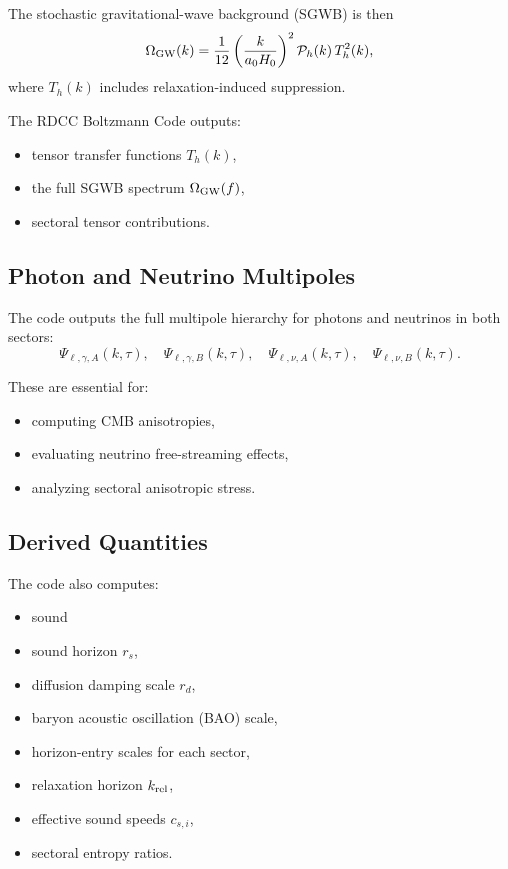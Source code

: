 \documentclass[11pt,a4paper]{article}
\begin{document}
The stochastic gravitational-wave background (SGWB) is then
\begin{equation}
\Omega_{\rm GW}(k) =
\frac{1}{12}\left(\frac{k}{a_0H_0}\right)^2
\mathcal{P}_h(k)\,T_h^2(k),
\end{equation}
where $T_h(k)$ includes relaxation-induced suppression.

The RDCC Boltzmann Code outputs:

\begin{itemize}
\item tensor transfer functions $T_h(k)$,
\item the full SGWB spectrum $\Omega_{\rm GW}(f)$,
\item sectoral tensor contributions.
\end{itemize}

\subsection{Photon and Neutrino Multipoles}

The code outputs the full multipole hierarchy for photons and neutrinos in both sectors:
\begin{equation}
\Psi_{\ell,\gamma,A}(k,\tau),\quad
\Psi_{\ell,\gamma,B}(k,\tau),\quad
\Psi_{\ell,\nu,A}(k,\tau),\quad
\Psi_{\ell,\nu,B}(k,\tau).
\end{equation}

These are essential for:

\begin{itemize}
\item computing CMB anisotropies,
\item evaluating neutrino free-streaming effects,
\item analyzing sectoral anisotropic stress.
\end{itemize}

\subsection{Derived Quantities}

The code also computes:

\begin{itemize}
\item sound
\item sound horizon $r_s$,
\item diffusion damping scale $r_d$,
\item baryon acoustic oscillation (BAO) scale,
\item horizon-entry scales for each sector,
\item relaxation horizon $k_{\rm rel}$,
\item effective sound speeds $c_{s,i}$,
\item sectoral entropy ratios.
\end{itemize}
\end{document}
